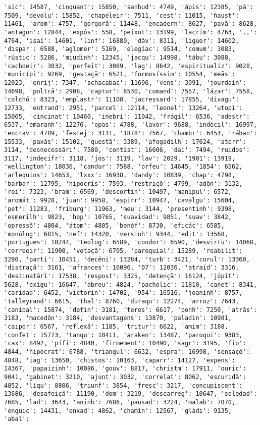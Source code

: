 \documentclass[11pt]{article}
\begin{document}
\begin{Verbatim}[commandchars=\\\{\}]
'sic': 14587, 'cinquant': 15850, 'sanhud': 4749, 'ápis': 12385, 'pá': 7509, 'devolu': 15852, 'chapeleir': 7511, 'cest': 11015, 'haust': 11461, 'arom': 4757, 'gorgorã': 11448, 'encadern': 8627, 'pavã': 8628, 'antagon': 12844, 'expôs': 558, 'peixot': 13199, 'lacrim': 4763, '.,': 4764, 'isaí': 14601, 'linf': 16880, 'dáv': 8311, 'liguor': 14602, 'dispar': 6588, 'aglomer': 5169, 'elegíac': 9514, 'comum': 3083, 'rústic': 5286, 'miudinh': 12345, 'jacqu': 14998, 'tábu': 3088, 'cachoeir': 3832, 'perfeit': 3089, 'lag': 8642, 'espiritualiz': 9028, 'municípi': 9269, 'gestaçã': 6521, 'formosíssim': 10554, 'meãs': 12023, 'enrij': 7347, 'schacabac': 11696, 'vens': 3091, 'jourdain': 14698, 'poltrã': 2908, 'captur': 6530, 'comand': 7557, 'lázar': 7558, 'colchõ': 8323, 'emplastr': 11108, 'jacressard': 17855, 'divagu': 12733, 'entrand': 2951, 'parcel': 12114, 'leonel': 13264, 'utopi': 15065, 'cincinat': 10460, 'inebri': 11042, 'frágil': 6536, 'adestr': 6537, 'emaranh': 12276, 'opas': 4788, 'lavor': 9688, 'indócil': 16997, 'encrav': 4789, 'festej': 3111, '1878': 7567, 'chambr': 6453, 'rában': 15533, 'paxás': 15102, 'questã': 3389, 'afogadilh': 17624, 'aterr': 3114, 'desnecessári': 7580, 'contist': 16606, 'dai': 7494, 'ruidos': 3117, 'indecifr': 3118, 'jos': 3119, 'lav': 2029, '1901': 13919, 'wellington': 18036, 'candur': 7588, 'orfeu': 14645, '1854': 6562, 'arlequins': 14653, 'lxxx': 16938, 'dandy': 10839, 'chap': 4798, 'barbar': 12795, 'hipocris': 7593, 'restriçõ': 4799, 'adôn': 3132, 'roí': 7323, 'bram': 6569, 'descortin': 10497, 'manipul': 6572, 'aromát': 9928, 'juan': 9958, 'espirr': 10947, 'cavalgu': 15604, 'pet': 11283, 'friburg': 11963, 'meu': 3144, 'presentinh': 9398, 'esmerilh': 9823, 'hop': 10765, 'suavidad': 9851, 'suav': 3842, 'opressõ': 4804, 'átom': 4805, 'benéf': 8730, 'eficác': 6585, 'monólog': 6815, 'nef': 14320, 'versinh': 9344, 'edit': 13568, 'portugues': 10244, 'teolog': 6589, 'condor': 6590, 'desvirtu': 14068, 'correeir': 11908, 'votaçã': 6705, 'paroquial': 15289, 'reabilit': 3280, 'parti': 10451, 'decêni': 13284, 'turb': 3421, 'curul': 13360, 'distraçã': 3161, 'afrances': 16096, '07': 12036, 'atraíd': 3316, 'destinatári': 17538, 'respost': 3325, 'detençã': 16124, 'júpit': 5628, 'exigu': 16647, 'abreu': 4824, 'pacholic': 11810, 'canet': 8341, 'caridad': 6452, 'victorin': 14702, '954': 16516, 'joaninh': 8757, 'talleyrand': 6615, 'thal': 8760, 'duraqu': 12274, 'arroz': 7643, 'canibal': 15874, 'defin': 3181, 'teres': 6617, 'ponh': 7250, 'atrás': 3183, 'macedôn': 3184, 'desvantagens': 13870, 'paladin': 10981, 'caipor': 6567, 'reflexã': 1185, 'tritur': 6622, 'amim': 3188, 'confet': 15773, 'tanqu': 10411, 'araken': 13487, 'paroqui': 9383, 'cax': 8492, 'pífi': 4840, 'firmement': 10490, 'sagr': 3195, 'fio': 4844, 'hipócrat': 6788, 'triangul': 6632, 'espra': 16998, 'sensaçõ': 4848, 'iag': 13650, 'chistos': 10163, 'caparr': 14127, 'expens': 14367, 'papaizinh': 10086, 'gouv': 8817, 'christm': 17911, 'ouric': 9041, 'gabinet': 3210, 'ajunt': 3032, 'correlat': 8062, 'escuridã': 4852, 'líqu': 8806, 'triunf': 3854, 'fresc': 3217, 'concupiscent': 13686, 'desafeiçã': 11190, 'dom': 3219, 'descarreg': 10647, 'soledad': 7685, 'lad': 3643, 'aninh': 7686, 'pausad': 3224, 'malab': 7070, 'enguic': 14431, 'enxad': 4862, 'chamin': 12567, 'gládi': 9135, 'abal': 
\end{Verbatim}
\end{document}
